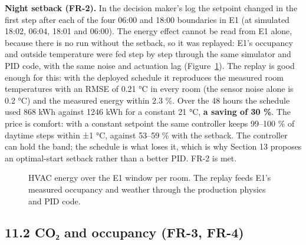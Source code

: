 \documentclass[11pt]{article}
\makeatletter
\DeclareRobustCommand{\_}{\ifmmode\nfss@text{\textunderscore}\else\textunderscore\allowbreak\fi}
\makeatother
\begin{document}
\textbf{Night setback (FR-2).} In the decision maker's log the setpoint changed in the first step after
each of the four 06:00 and 18:00 boundaries in E1 (at simulated 18:02, 06:04,
18:01 and 06:00). The energy effect cannot be read from E1 alone, because there
is no run without the setback, so it was replayed: E1's occupancy and outside
temperature were fed step by step through the same simulator and PID code, with
the same noise and actuation lag (Figure~\ref{fig:energy}). The replay is good
enough for this: with the deployed schedule it reproduces the measured room
temperatures with an RMSE of 0.21 °C in every room (the sensor noise alone is
0.2 °C) and the measured energy within 2.3 \%. Over the 48 hours the schedule
used 868 kWh against 1246 kWh for a constant 21 °C, \textbf{a saving of 30 \%}.
The price is comfort: with a constant setpoint the same controller keeps
99–100 \% of daytime steps within ±1 °C, against 53–59 \% with the setback. The
controller can hold the band; the schedule is what loses it, which is why
Section 13 proposes an optimal-start setback rather than a better PID. FR-2 is
met.

\begin{figure}[H]
\centering
{}
\caption{HVAC energy over the E1 window per room. The replay feeds E1's measured
occupancy and weather through the production physics and PID code.}
\label{fig:energy}
\end{figure}

\subsection{11.2 CO₂ and occupancy (FR-3, FR-4)}
\end{document}
